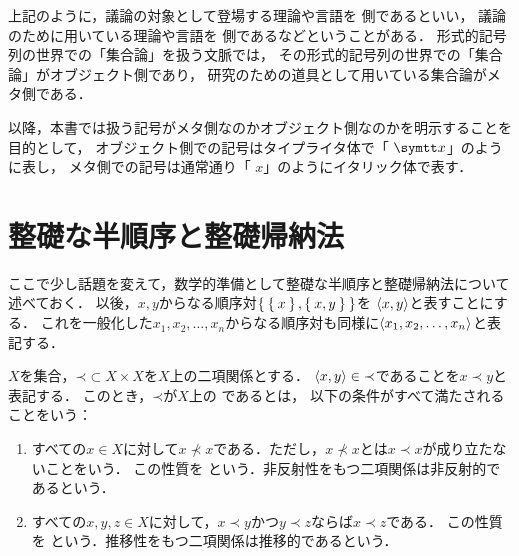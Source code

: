 上記のように，議論の対象として登場する理論や言語を%
%
側であるといい，
議論のために用いている理論や言語を%
%
側であるなどということがある．
形式的記号列の世界での「集合論」を扱う文脈では，
その形式的記号列の世界での「集合論」がオブジェクト側であり，
研究のための道具として用いている集合論がメタ側である．

以降，本書では扱う記号がメタ側なのかオブジェクト側なのかを明示することを目的として，
オブジェクト側での記号はタイプライタ体で「%
%
\(\obj{x}\)」のように表し，
メタ側での記号は通常通り「%
%
\(x\)」のようにイタリック体で表す．

\section{整礎な半順序と整礎帰納法} \label{sec:well-founded}

ここで少し話題を変えて，数学的準備として整礎な半順序と整礎帰納法について述べておく．
以後，\(x, y\)からなる順序対\(\Set{\Set{x}, \Set{x, y}}\)を%
\(\langle x, y \rangle\)と表すことにする．
これを一般化した\(x_1, x_2, \dots, x_n\)からなる順序対も同様に\(\langle x_1, x_2, \dots, x_n \rangle\)と表記する．

\begin{Def} \label{Def:preorderedset}
	\(X\)を集合，\(\mathord{\prec} \subset X \times X\)を\(X\)上の二項関係とする．
	\(\langle x, y \rangle \in \mathord{\prec}\)であることを\(x \prec y\)と表記する．
	このとき，\(\mathord{\prec}\)が\(X\)上の%
	であるとは，
	以下の条件がすべて満たされることをいう：
	\begin{enumerate}
		\item すべての\(x \in X\)に対して\(x \not \prec x\)である．ただし，\(x \not \prec x\)とは\(x \prec x\)が成り立たないことをいう．
		      この性質を%
		      という．非反射性をもつ二項関係は非反射的であるという．
		\item すべての\(x, y, z \in X\)に対して，\(x \prec y\)かつ\(y \prec z\)ならば\(x \prec z\)である．
		      この性質を%
		      という．推移性をもつ二項関係は推移的であるという．
	\end{enumerate}
\end{Def}


